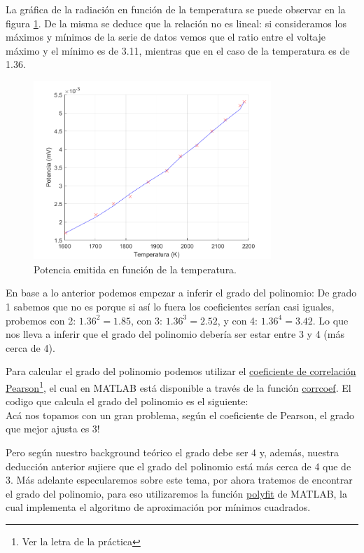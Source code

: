 \documentclass[a4paper]{article}
\begin{document}
La gráfica de la radiación en función de la temperatura se puede observar en la figura \ref{fig:sb1}. De la misma se deduce que la relación no es lineal: si consideramos los máximos y mínimos de la serie de datos vemos que el ratio entre el voltaje máximo y el mínimo es de 3.11, mientras que en el caso de la temperatura es de 1.36.

\begin{figure}[h!]
\centering
\includegraphics[width=0.8\textwidth]{assets/Stefan_Boltzmann1.png}
\caption{\label{fig:sb1}Potencia emitida en función de la temperatura.}
\end{figure}

En base a lo anterior podemos empezar a inferir el grado del polinomio: De grado 1 sabemos que no es porque si así lo fuera los coeficientes serían casi iguales, probemos con 2: $1.36^2 = 1.85$, con 3: $1.36^3 = 2.52$, y con 4: $1.36^4 = 3.42$. Lo que nos lleva a inferir que el grado del polinomio debería ser estar entre 3 y 4 (más cerca de 4).

Para calcular el grado del polinomio podemos utilizar el \href{https://en.wikipedia.org/wiki/Pearson_correlation_coefficient}{coeficiente de correlación Pearson}\footnote{Ver la letra de la práctica}, el cual en MATLAB está disponible a través de la función \href{https://www.mathworks.com/help/matlab/ref/corrcoef.html}{corrcoef}. El codigo que calcula el grado del polinomio es el siguiente:
\\


Acá nos topamos con un gran problema, según el coeficiente de Pearson, el grado que mejor ajusta es 3!

Pero según nuestro background teórico el grado debe ser 4 y, además, nuestra deducción anterior sujiere que el grado del polinomio está más cerca de 4 que de 3. Más adelante especularemos sobre este tema, por ahora tratemos de encontrar el grado del polinomio, para eso utilizaremos la función \href{https://www.mathworks.com/help/matlab/ref/polyfit.html}{polyfit} de MATLAB, la cual implementa el algoritmo de aproximación por mínimos cuadrados.
\end{document}
